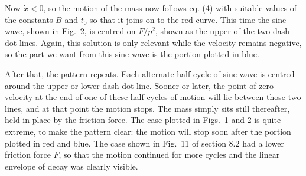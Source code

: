 
  Now $\dot{x}<0$, so the motion of the mass now follows eq. (4) with suitable 
  values of the constants $B$ and $t_0$ so that it joins on to the red curve. 
  This time the sine wave, shown in Fig.\ 2, is centred on $F/p^2$, shown as 
  the upper of the two dash-dot lines. Again, this solution is only relevant 
  while the velocity remains negative, so the part we want from this sine wave 
  is the portion plotted in blue. 


  After that, the pattern repeats. Each alternate half-cycle of sine wave is 
  centred around the upper or lower dash-dot line. Sooner or later, the point 
  of zero velocity at the end of one of these half-cycles of motion will lie 
  between those two lines, and at that point the motion stops. The mass simply 
  sits still thereafter, held in place by the friction force. The case plotted 
  in Figs.\ 1 and 2 is quite extreme, to make the pattern clear: the motion 
  will stop soon after the portion plotted in red and blue. The case shown in 
  Fig.\ 11 of section 8.2 had a lower friction force $F$, so that the motion 
  continued for more cycles and the linear envelope of decay was clearly 
  visible. 